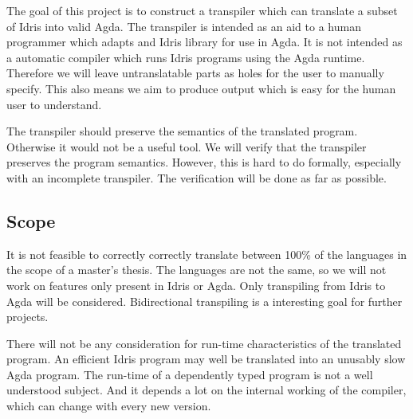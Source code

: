\documentclass[parskip=half]{scrartcl}
\begin{document}
The goal of this project is to construct a transpiler which can translate
a subset of Idris into valid Agda. The transpiler is intended as an aid to
a human programmer which adapts and Idris library for use in Agda.  It is not
intended as a automatic compiler which runs Idris programs using the Agda
runtime. Therefore we will leave untranslatable parts as holes for the user to
manually specify. This also means we aim to produce output which is easy for
the human user to understand.



The transpiler should preserve the semantics of the translated program.
Otherwise it would not be a useful tool.  We will verify that the transpiler
preserves the program semantics.  However, this is hard to do formally,
especially with an incomplete transpiler.  The verification will be done as far
as possible.


\subsection{Scope}

It is not feasible to correctly correctly translate between 100\% of the
languages in the scope of a master's thesis.  The languages are not the same,
so we will not work on features only present in Idris or Agda.  Only
transpiling from Idris to Agda will be considered. Bidirectional transpiling is
a interesting goal for further projects.

There will not be any consideration for run-time characteristics of the
translated program. An efficient Idris program may well be translated into an
unusably slow Agda program. The run-time of a dependently typed program is not
a well understood subject. And it depends a lot on the internal working of the
compiler, which can change with every new version.
\end{document}
